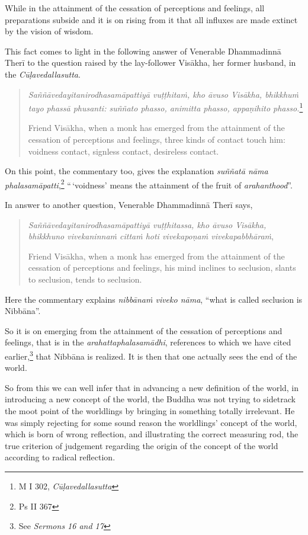 While in the attainment of the cessation of perceptions and feelings, all preparations subside and it is on rising from it that all influxes are made extinct by the vision of wisdom.

This fact comes to light in the following answer of Venerable Dhammadinnā Therī to the question raised by the lay-follower Visākha, her former husband, in the \emph{Cūḷavedallasutta}.

\begin{quote}
\emph{Saññāvedayitanirodhasamāpattiyā vuṭṭhitaṁ, kho āvuso Visākha, bhikkhuṁ tayo phassā phusanti: suññato phasso, animitta phasso, appaṇihito phasso.}\footnote{M I 302, \emph{Cūḷavedallasutta}}

Friend Visākha, when a monk has emerged from the attainment of the cessation of perceptions and feelings, three kinds of contact touch him: voidness contact, signless contact, desireless contact.
\end{quote}

On this point, the commentary too, gives the explanation \emph{suññatā nāma phalasamāpatti},\footnote{Ps II 367} ``\,`voidness' means the attainment of the fruit of \emph{arahanthood}''.

In answer to another question, Venerable Dhammadinnā Therī says,

\begin{quote}
\emph{Saññāvedayitanirodhasamāpattiyā vuṭṭhitassa, kho āvuso Visākha, bhikkhuno vivekaninnaṁ cittaṁ hoti vivekapoṇaṁ vivekapabbhāraṁ},

Friend Visākha, when a monk has emerged from the attainment of the cessation of perceptions and feelings, his mind inclines to seclusion, slants to seclusion, tends to seclusion.
\end{quote}

Here the commentary explains \emph{nibbānaṁ viveko nāma}, ``what is called seclusion is Nibbāna''.

So it is on emerging from the attainment of the cessation of perceptions and feelings, that is in the \emph{arahattaphalasamādhi}, references to which we have cited earlier,\footnote{See \emph{Sermons 16 and 17}} that Nibbāna is realized. It is then that one actually sees the end of the world.

So from this we can well infer that in advancing a new definition of the world, in introducing a new concept of the world, the Buddha was not trying to sidetrack the moot point of the worldlings by bringing in something totally irrelevant. He was simply rejecting for some sound reason the worldlings' concept of the world, which is born of wrong reflection, and illustrating the correct measuring rod, the true criterion of judgement regarding the origin of the concept of the world according to radical reflection.

